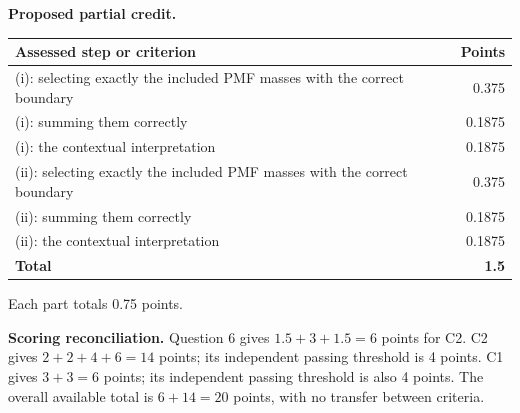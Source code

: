 \par\smallskip
\noindent\begin{minipage}{\linewidth}
\textbf{Proposed partial credit.}\par\smallskip
\begin{tabularx}{\linewidth}{@{}>{\raggedright\arraybackslash}X r@{}}\toprule
\textbf{Assessed step or criterion} & \textbf{Points}\\\midrule
(i): selecting exactly the included PMF masses with the correct boundary & 0.375\\
(i): summing them correctly & 0.1875\\
(i): the contextual interpretation & 0.1875\\
(ii): selecting exactly the included PMF masses with the correct boundary & 0.375\\
(ii): summing them correctly & 0.1875\\
(ii): the contextual interpretation & 0.1875\\
\midrule
\textbf{Total} & \textbf{1.5}\\
\bottomrule\end{tabularx}
\end{minipage}\par\smallskip

Each part totals 0.75 points.

\par\vspace{3mm}\secInicio[][sec:q6]

\textbf{Scoring reconciliation.} Question 6 gives $1.5+3+1.5=6$ points for C2. C2 gives $2+2+4+6=14$ points; its independent passing threshold is 4 points. C1 gives $3+3=6$ points; its independent passing threshold is also 4 points. The overall available total is $6+14=20$ points, with no transfer between criteria.


